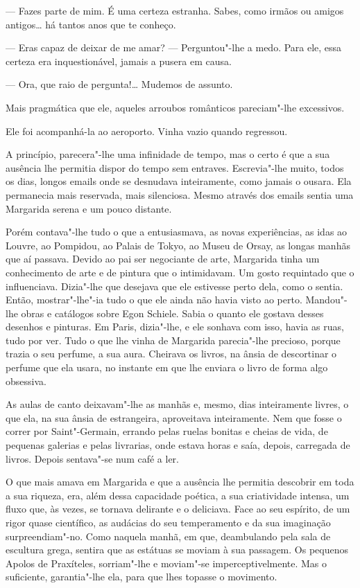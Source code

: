 --- Fazes parte de mim. É uma certeza estranha. Sabes, como irmãos ou
amigos antigos\ldots{} há tantos anos que te conheço.

--- Eras capaz de deixar de me amar? --- Perguntou"-lhe a medo. Para ele,
essa certeza era inquestionável, jamais a pusera em causa.

--- Ora, que raio de pergunta!\ldots{} Mudemos de assunto.

Mais pragmática que ele, aqueles arroubos românticos pareciam"-lhe
excessivos.

Ele foi acompanhá-la ao aeroporto. Vinha vazio quando regressou.

A princípio, parecera"-lhe uma infinidade de tempo, mas o certo é que a
sua ausência lhe permitia dispor do tempo sem entraves. Escrevia"-lhe
muito, todos os dias, longos emails onde se desnudava inteiramente, como
jamais o ousara. Ela permanecia mais reservada, mais silenciosa. Mesmo
através dos emails sentia uma Margarida serena e um pouco distante.

Porém contava"-lhe tudo o que a entusiasmava, as novas experiências, as
idas ao Louvre, ao Pompidou, ao Palais de Tokyo, ao Museu de Orsay, as
longas manhãs que aí passava. Devido ao pai ser negociante de arte,
Margarida tinha um conhecimento de arte e de pintura que o intimidavam.
Um gosto requintado que o influenciava. Dizia"-lhe que desejava que ele
estivesse perto dela, como o sentia. Então, mostrar"-lhe"-ia tudo o que
ele ainda não havia visto ao perto. Mandou"-lhe obras e catálogos sobre
Egon Schiele. Sabia o quanto ele gostava desses desenhos e pinturas. Em
Paris, dizia"-lhe, e ele sonhava com isso, havia as ruas, tudo por ver.
Tudo o que lhe vinha de Margarida parecia"-lhe precioso, porque trazia o
seu perfume, a sua aura. Cheirava os livros, na ânsia de descortinar o
perfume que ela usara, no instante em que lhe enviara o livro de forma
algo obsessiva.

As aulas de canto deixavam"-lhe as manhãs e, mesmo, dias inteiramente
livres, o que ela, na sua ânsia de estrangeira, aproveitava
inteiramente. Nem que fosse o correr por Saint"-Germain, errando pelas
ruelas bonitas e cheias de vida, de pequenas galerias e pelas livrarias,
onde estava horas e saía, depois, carregada de livros. Depois sentava"-se
num café a ler.

O que mais amava em Margarida e que a ausência lhe permitia descobrir em
toda a sua riqueza, era, além dessa capacidade poética, a sua
criatividade intensa, um fluxo que, às vezes, se tornava delirante e o
deliciava. Face ao seu espírito, de um rigor quase científico, as
audácias do seu temperamento e da sua imaginação surpreendiam"-no. Como
naquela manhã, em que, deambulando pela sala de escultura grega, sentira
que as estátuas se moviam à sua passagem. Os pequenos Apolos de
Praxíteles, sorriam"-lhe e moviam"-se imperceptivelmente. Mas o
suficiente, garantia"-lhe ela, para que lhes topasse o movimento.

